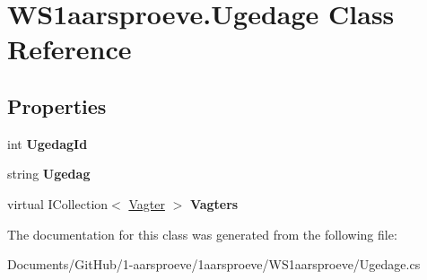 \hypertarget{class_w_s1aarsproeve_1_1_ugedage}{}\section{W\+S1aarsproeve.\+Ugedage Class Reference}
\label{class_w_s1aarsproeve_1_1_ugedage}
\subsection*{Properties}
\begin{DoxyCompactItemize}
\item 
\hypertarget{class_w_s1aarsproeve_1_1_ugedage_af22c4158db6879ee298b5d5785645a62}{}int {\bfseries Ugedag\+Id}\label{class_w_s1aarsproeve_1_1_ugedage_af22c4158db6879ee298b5d5785645a62}

\item 
\hypertarget{class_w_s1aarsproeve_1_1_ugedage_a35425f19c224ca5c7060eaa9227fd9f5}{}string {\bfseries Ugedag}\label{class_w_s1aarsproeve_1_1_ugedage_a35425f19c224ca5c7060eaa9227fd9f5}

\item 
\hypertarget{class_w_s1aarsproeve_1_1_ugedage_aef92a219a1e8e815aea4b956059847ee}{}virtual I\+Collection$<$ \hyperlink{class_w_s1aarsproeve_1_1_vagter}{Vagter} $>$ {\bfseries Vagters}\label{class_w_s1aarsproeve_1_1_ugedage_aef92a219a1e8e815aea4b956059847ee}

\end{DoxyCompactItemize}


The documentation for this class was generated from the following file\+:\begin{DoxyCompactItemize}
\item 
Documents/\+Git\+Hub/1-\/aarsproeve/1aarsproeve/\+W\+S1aarsproeve/Ugedage.\+cs\end{DoxyCompactItemize}
